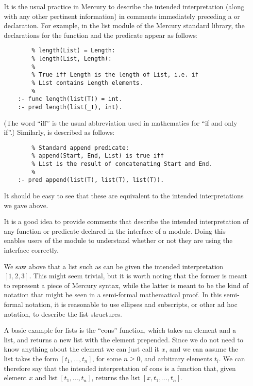 It is the usual practice in Mercury
to describe the intended interpretation
(along with any other pertinent information)
in comments immediately preceding
a  or  declaration.
For example,
in the list module of the Mercury standard library,
the declarations for the  function
and the  predicate
appear as follows:
\begin{verbatim}
        % length(List) = Length:
        % length(List, Length):
        %
        % True iff Length is the length of List, i.e. if
        % List contains Length elements.
        %
    :- func length(list(T)) = int.
    :- pred length(list(_T), int).
\end{verbatim}
(The word ``iff'' is the usual abbreviation used in mathematics
for ``if and only if''.)
Similarly,  is described as follows:
\begin{verbatim}
        % Standard append predicate:
        % append(Start, End, List) is true iff
        % List is the result of concatenating Start and End.
        %
    :- pred append(list(T), list(T), list(T)).
\end{verbatim}
It should be easy to see that
these are equivalent to the intended interpretations we gave above.

It is a good idea to provide comments
that describe the intended interpretation
of any function or predicate
declared in the interface of a module.
Doing this enables users of the module
to understand whether or not they are
using the interface correctly.

We saw above that a list such as \co{[1,2,3]}
can be given the intended interpretation $[1, 2, 3]$.
This might seem trivial,
but it is worth noting that
the former is meant to represent a piece of Mercury syntax,
while the latter is meant to be the kind of notation
that might be seen in a semi-formal mathematical proof.
In this semi-formal notation, it is reasonable to use ellipses and subscripts,
or other ad hoc notation,
to describe the list structures.

A basic example for lists is the ``cons'' function,
which takes an element and a list,
and returns a new list with the element prepended.
Since we do not need to know anything about the element
we can just call it $x$,
and we can assume the list takes the form $[t_1, \ldots, t_n]$,
for some $n \geqslant 0$, and arbitrary elements $t_i$.
We can therefore say that
the intended interpretation of cons is a function that,
given element $x$ and list $[t_1, \ldots, t_n]$,
returns the list $[x, t_1, \ldots, t_n]$.

